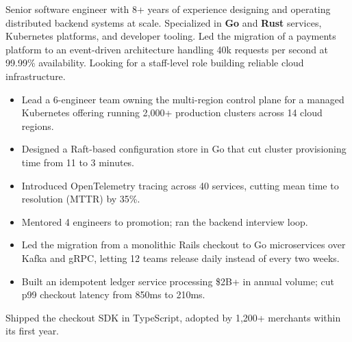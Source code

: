 

\begin{justify}
Senior software engineer with 8+ years of experience designing and operating distributed backend systems at scale. Specialized in \textbf{Go} and \textbf{Rust} services, Kubernetes platforms, and developer tooling. Led the migration of a payments platform to an event-driven architecture handling 40k requests per second at 99.99\% availability. Looking for a staff-level role building reliable cloud infrastructure.
\end{justify}


\begin{itemize}
  \item Lead a 6-engineer team owning the multi-region control plane for a managed Kubernetes offering running 2,000+ production clusters across 14 cloud regions.
  \item Designed a Raft-based configuration store in Go that cut cluster provisioning time from 11 to 3 minutes.
  \item Introduced OpenTelemetry tracing across 40 services, cutting mean time to resolution (MTTR) by 35\%.
  \item Mentored 4 engineers to promotion; ran the backend interview loop.
\end{itemize}

\vspace{2pt}
\smallskip

\begin{cvgroup}[rule]
  \begin{itemize}
    \item Led the migration from a monolithic Rails checkout to Go microservices over Kafka and gRPC, letting 12 teams release daily instead of every two weeks.
    \item Built an idempotent ledger service processing \$2B+ in annual volume; cut p99 checkout latency from 850\:ms to 210\:ms.
  \end{itemize}

  \smallskip

  Shipped the checkout SDK in TypeScript, adopted by 1,200+ merchants within its first year.

  \smallskip
\end{cvgroup}

